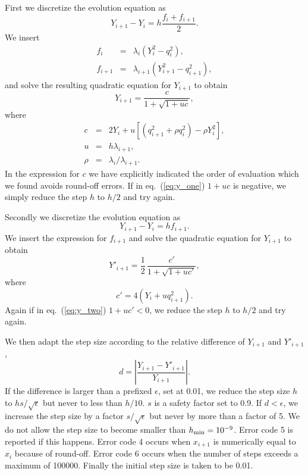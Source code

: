 \documentclass[a4paper,10pt,oneside]{book}
\begin{document}
First we discretize the evolution equation as
\begin{equation}
  Y_{i+1} - Y_{i} = h \frac{ f_i + f_{i+1}}{2} .
\end{equation}
We insert
\begin{eqnarray}
  f_{i} &=& \lambda_{i} \left( Y_{i}^2 - q_{i}^2 \right), \\
  f_{i+1} &=& \lambda_{i+1} \left( Y_{i+1}^2 - q_{i+1}^2 \right) ,
\end{eqnarray}
and solve the resulting quadratic equation for $Y_{i+1}$ to obtain
\begin{equation}
  \label{eq:y_one}
  Y_{i+1} = \frac{c}{1+\sqrt{1+uc}} ,
\end{equation}
where
\begin{eqnarray}
c &=& 2 Y_{i} + u \left[ (q^2_{i+1} + \rho q^2_{i}) - \rho Y^2_{i} \right] , \\
u &=& h \lambda_{i+1} ,\\
\rho &=& \lambda_i / \lambda_{i+1} .
\end{eqnarray}
In the expression for $c$ we have explicitly indicated the order of evaluation
which we found avoids round-off errors. If in eq.~(\ref{eq:y_one}) $1+uc$ is
negative, we simply reduce the step $h$ to $h/2$ and try again.


Secondly we discretize the evolution equation as
\begin{equation}
  Y_{i+1} - Y_{i} = h f_{i+1} .
\end{equation}
We insert the expression for $f_{i+1}$ 
and solve the quadratic equation for $Y_{i+1}$ to obtain
\begin{equation}
  \label{eq:y_two}
  Y'_{i+1} = \frac{1}{2} \, \frac{c'}{1+\sqrt{1+uc'}} ,
\end{equation}
where
\begin{equation}
  c' = 4 \left( Y_{i} + u q^2_{i+1} \right) .
\end{equation}
Again if in eq.~(\ref{eq:y_two}) $1+uc'<0$, we reduce the step $h$ to $h/2$ and
try again.

We then adapt the step size according to the relative difference of $Y_{i+1} $
and $Y'_{i+1}$,
\begin{equation}
d = \left| \frac{ Y_{i+1} - Y'_{i+1} }{ Y_{i+1} } \right| .
\end{equation}
If the difference is larger than a prefixed $\epsilon$, set at 0.01, we reduce
the step size $h$ to $hs/\sqrt{\epsilon}$ but never to less than $h/10$.  $s$
is a safety factor set to 0.9. If $d<\epsilon$, we increase the step size by a
factor $s/\sqrt{\epsilon}$ but never by more than a factor of 5.  We do not
allow the step size to become smaller than $h_{\rm min} = 10^{-9}$. Error code
5 is reported if this happens.  Error code 4 occurs when $x_{i+1}$ is
numerically equal to $x_{i}$ because of round-off. Error code 6 occurs when the
number of steps exceeds a maximum of 100000.  Finally the initial step size is
taken to be 0.01.
\end{document}
